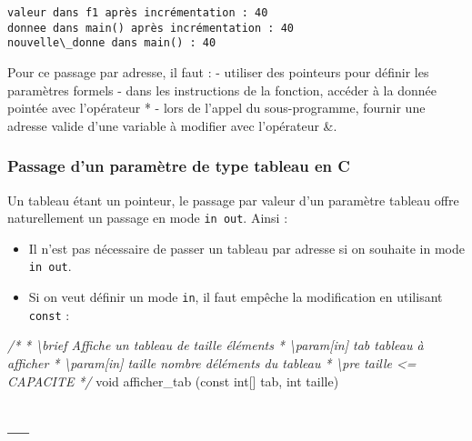 \documentclass[11pt]{article}
\providecommand{\tightlist}{%
      \setlength{\itemsep}{0pt}\setlength{\parskip}{0pt}}
\newenvironment{Shaded}{}{}
\newcommand{\DataTypeTok}[1]{\textcolor[rgb]{0.56,0.13,0.00}{{#1}}}
\newcommand{\CommentTok}[1]{\textcolor[rgb]{0.38,0.63,0.69}{\textit{{#1}}}}
\newcommand{\NormalTok}[1]{{#1}}
\begin{document}
    \begin{Verbatim}[commandchars=\\\{\}]
valeur dans f1 après incrémentation : 40
donnee dans main() après incrémentation : 40
nouvelle\_donne dans main() : 40
    \end{Verbatim}

    Pour ce passage par adresse, il faut : - utiliser des pointeurs pour
définir les paramètres formels - dans les instructions de la fonction,
accéder à la donnée pointée avec l'opérateur * - lors de l'appel du
sous-programme, fournir une adresse valide d'une variable à modifier
avec l'opérateur \&.

    \hypertarget{passage-dun-paramuxe8tre-de-type-tableau-en-c}{%
\subsubsection{Passage d'un paramètre de type tableau en
C}\label{passage-dun-paramuxe8tre-de-type-tableau-en-c}}

Un tableau étant un pointeur, le passage par valeur d'un paramètre
tableau offre naturellement un passage en mode \texttt{in\ out}. Ainsi :

\begin{itemize}
\tightlist
\item
  Il n'est pas nécessaire de passer un tableau par adresse si on
  souhaite in mode \texttt{in\ out}.
\item
  Si on veut définir un mode \texttt{in}, il faut empêche la
  modification en utilisant \texttt{const} :
\end{itemize}

\begin{Shaded}
\begin{Highlighting}[]
\CommentTok{/*}
\CommentTok{ * \textbackslash{}brief Affiche un tableau de taille éléments}
\CommentTok{ * \textbackslash{}param[in] tab tableau à afficher}
\CommentTok{ * \textbackslash{}param[in] taille nombre d\textquotesingle{}éléments du tableau}
\CommentTok{ * \textbackslash{}pre taille \textless{}= CAPACITE}
\CommentTok{ */} 
\DataTypeTok{void}\NormalTok{ afficher\_tab (}\DataTypeTok{const} \DataTypeTok{int}\NormalTok{[] tab, }\DataTypeTok{int}\NormalTok{ taille)}
\end{Highlighting}
\end{Shaded}

    \hypertarget{section}{%
\subsection{---}\label{section}}
\end{document}
